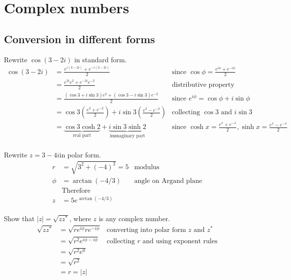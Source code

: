 \section{Complex numbers}

  \subsection{Conversion in different forms}
  Rewrite $\cos(3-2i)$ in standard form.
  \begin{align*}
    \cos(3-2i) & = \frac{e^{i(3-2i)} + e^{-i(3-2i)}}{2}
               & \text{since }\cos\phi = \frac{e^{i\phi} + e^{-i\phi}}{2} \\
               & = \frac{e^{3i}e^{2} + e^{-3i}e^{-2}}{2}
               & \text{distributive property} \\
               & = \frac{(\cos3 + i\sin3)e^{2} + (\cos3 - i\sin3)e^{-2}}{2}
               & \text{since } e^{i\phi} = \cos\phi + i\sin\phi \\
               & = \cos3\left(\frac{e^2+e^{-2}}{2}\right) + i\sin3\left(\frac{e^2-e^{-2}}{2}\right)
               & \text{collecting } \cos3 \text{ and } i\sin3 \\
               & = \underbrace{\cos3\cosh2}_{\text{real part}} + \underbrace{i\sin3\sinh2}_{\text{immaginary part}}
               & \text{since } \cosh x = \frac{e^x+e^{-x}}{2}, \sinh x = \frac{e^x-e^{-x}}{2} \\
  \end{align*}

  Rewrite $z = 3 - 4i$in polar form.
  \begin{align*}
    r       & = \sqrt{3^2 + (-4)^2} = 5
            & \text{modulus} \\
    \phi    & = \arctan(-4/3)
            & \text{angle on Argand plane} \\
            & \text{Therefore} \\
    z       & = 5e^{\arctan(-4/3)}\\
  \end{align*}

  Show that $|z| = \sqrt{zz^*}$, where $z$ is any complex number.
  \begin{align*}
    \sqrt{zz^*} & = \sqrt{re^{i\phi}re^{-i\phi}}
                & \text{converting into polar form } z \text{ and } z^* \\
                & = \sqrt{r^2e^{i\phi -i\phi}}
                & \text{collecting } r \text{ and using exponent rules} \\
                & = \sqrt{r^2e^{0}} \\
                & = \sqrt{r^2} \\
                & = r = |z|
  \end{align*}

